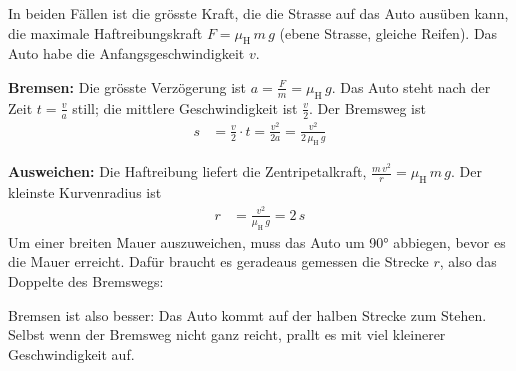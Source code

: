 In beiden Fällen ist die grösste Kraft, die die Strasse auf das Auto ausüben kann, die maximale Haftreibungskraft $F = \mu_\mathrm{H}\,m\,g$ (ebene Strasse, gleiche Reifen). Das Auto habe die Anfangsgeschwindigkeit $v$.

\textbf{Bremsen:} Die grösste Verzögerung ist $a = \frac{F}{m} = \mu_\mathrm{H}\,g$. Das Auto steht nach der Zeit $t = \frac{v}{a}$ still; die mittlere Geschwindigkeit ist $\frac{v}{2}$. Der Bremsweg ist
\begin{align}
 s &= \frac{v}{2}\cdot t = \frac{v^2}{2a} = \frac{v^2}{2\,\mu_\mathrm{H}\,g}
\end{align}

\textbf{Ausweichen:} Die Haftreibung liefert die Zentripetalkraft, $\frac{m\,v^2}{r} = \mu_\mathrm{H}\,m\,g$. Der kleinste Kurvenradius ist
\begin{align}
 r &= \frac{v^2}{\mu_\mathrm{H}\,g} = 2\,s
\end{align}
Um einer breiten Mauer auszuweichen, muss das Auto um \ang{90} abbiegen, bevor es die Mauer erreicht. Dafür braucht es geradeaus gemessen die Strecke $r$, also das Doppelte des Bremswegs:

\begin{center}
\end{center}

Bremsen ist also besser: Das Auto kommt auf der halben Strecke zum Stehen. Selbst wenn der Bremsweg nicht ganz reicht, prallt es mit viel kleinerer Geschwindigkeit auf.
